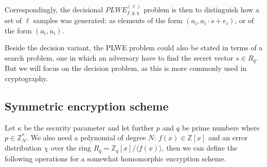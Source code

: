 \documentclass[../main.tex]{subfiles}
\begin{document}
% 

Correspondingly, the decisional $PLWE_{f, q, \chi}^{(\ell)}$ problem is then to distinguish how a set of $\ell$ samples was generated: as elements of the form $(a_i, a_i \cdot s + e_i)$, or of the form $(a_i, u_i)$.

Beside the decision variant, the PLWE problem could also be stated in terms of a search problem, one in which
an adversary have to find the secret vector $s \in R_q$. But we will focus on the decision problem, as this
is more commonly used in cryptography.

\subsection{Symmetric encryption scheme}

Let $\kappa$ be the security parameter and let further $p$ and $q$ be prime numbers where $p \in \mathbb{Z}_N^*$.
We also need a polynomial of degree $N$: $f(x) \in \mathbb{Z}[x]$ and an error distribution $\chi$ over the ring
$R_q = \mathbb{Z}_q[x] / \langle f(x) \rangle$, then we can define the following operations for a somewhat homomorphic
encryption scheme.
\end{document}
